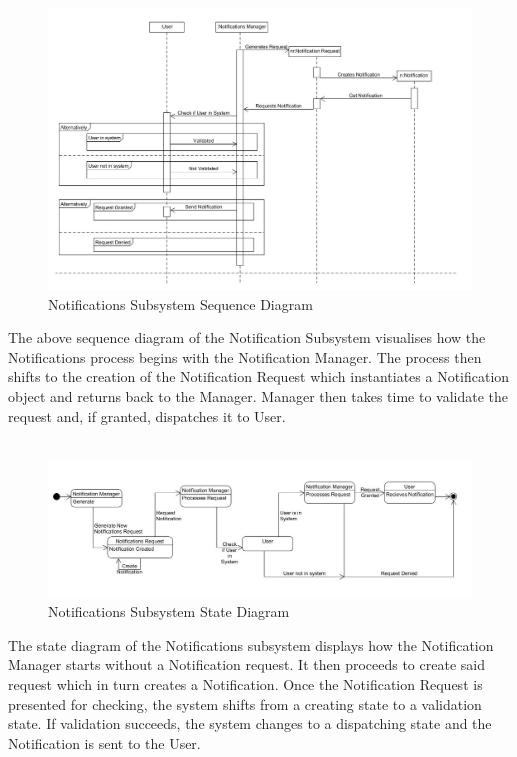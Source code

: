 \documentclass{article}
\begin{document}
				\begin{figure}[h!]
					\includegraphics[scale=0.5]{Diagrams/Sequence_Diagram_Notifications.JPG}
					\caption{Notifications Subsystem Sequence Diagram}	
				\end{figure}
				{The above sequence diagram of the Notification Subsystem visualises how the Notifications process begins with the Notification Manager. The process then shifts to the creation of the Notification Request which instantiates a Notification object and returns back to the Manager. Manager then takes time to validate the request and, if granted, dispatches it to User.\\\\}
				
				\begin{figure}[h!]
					\includegraphics[scale=0.5]{Diagrams/State_Diagram_Notifications.JPG}
					\caption{Notifications Subsystem State Diagram}	
				\end{figure}
				{The state diagram of the Notifications subsystem displays how the Notification Manager starts without a Notification request. It then proceeds to create said request which in turn creates a Notification. Once the Notification Request is presented for checking, the system shifts from a creating state to a validation state. If validation succeeds, the system changes to a dispatching state and the Notification is sent to the User.\\\\}
				
\end{document}
